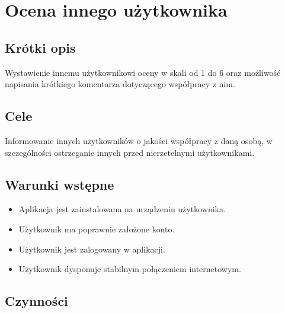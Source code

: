 \documentclass[licencjacka]{pracamgr}
\begin{document}
\section{Ocena innego użytkownika}
    \subsection{Krótki opis}
    Wystawienie innemu użytkownikowi oceny w skali od 1 do 6 oraz możliwość napisania krótkiego komentarza dotyczącego współpracy z nim.
    \subsection{Cele}
    Informowanie innych użytkowników o jakości współpracy z daną osobą, w szczególności ostrzeganie innych przed nierzetelnymi użytkownikami.
    \subsection{Warunki wstępne}
    \begin{itemize}
        \item Aplikacja jest zainstalowana na urządzeniu użytkownika.
        \item Użytkownik ma poprawnie założone konto.
        \item Użytkownik jest zalogowany w aplikacji.
        \item Użytkownik dysponuje stabilnym połączeniem internetowym.
    \end{itemize}
    \subsection{Czynności}
\end{document}

